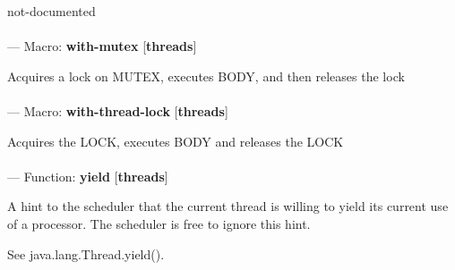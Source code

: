 \begin{adjustwidth}{5em}{5em}
not-documented
\end{adjustwidth}

\paragraph{}
\label{THREADS:WITH-MUTEX}
--- Macro: \textbf{with-mutex} [\textbf{threads}] \textit{}

\begin{adjustwidth}{5em}{5em}
Acquires a lock on MUTEX, executes BODY, and then releases the lock
\end{adjustwidth}

\paragraph{}
\label{THREADS:WITH-THREAD-LOCK}
--- Macro: \textbf{with-thread-lock} [\textbf{threads}] \textit{}

\begin{adjustwidth}{5em}{5em}
Acquires the LOCK, executes BODY and releases the LOCK
\end{adjustwidth}

\paragraph{}
\label{THREADS:YIELD}
--- Function: \textbf{yield} [\textbf{threads}] \textit{}

\begin{adjustwidth}{5em}{5em}
A hint to the scheduler that the current thread is willing to yield its current use of a processor. The scheduler is free to ignore this hint. 

See java.lang.Thread.yield().
\end{adjustwidth}

